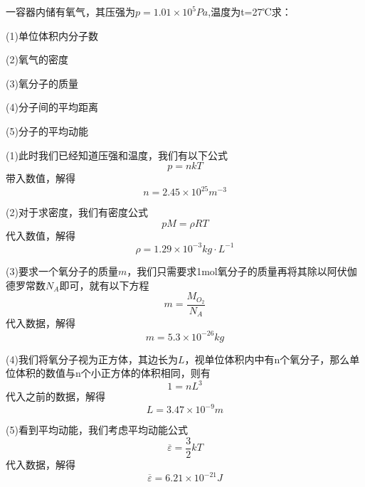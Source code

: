 \documentclass[lang=cn,10pt]{elegantbook}
\begin{document}
	\begin{example}
		一容器内储有氧气，其压强为$p=1.01\times 10^{5}Pa$,温度为t=27℃求：
		
		(1)单位体积内分子数
		
		(2)氧气的密度
		
		(3)氧分子的质量
		
		(4)分子间的平均距离
		
		(5)分子的平均动能
	\end{example}
	\begin{solution}
		(1)此时我们已经知道压强和温度，我们有以下公式
		\begin{equation*}
			p=nkT
		\end{equation*}
		带入数值，解得
		\begin{equation*}
			n=2.45\times10^{25}m^{-3}
		\end{equation*}
		
		(2)对于求密度，我们有密度公式
		\begin{equation*}
			pM=\rho RT
		\end{equation*}
		代入数值，解得
		\begin{equation*}
			\rho=1.29\times 10^{-3}kg\cdot L^{-1}
		\end{equation*}
		
		(3)要求一个氧分子的质量$m$，我们只需要求1mol氧分子的质量再将其除以阿伏伽德罗常数$N_{A}$即可，就有以下方程
		\begin{equation*}
			m=\frac{M_{O_{2}}}{N_{A}}
		\end{equation*}
		代入数据，解得
		\begin{equation*}
			m=5.3\times 10^{-26}kg
		\end{equation*}
		
		(4)我们将氧分子视为正方体，其边长为$L$，视单位体积内中有n个氧分子，那么单位体积的数值与n个小正方体的体积相同，则有
		\begin{equation*}
			1=nL^{3}
		\end{equation*}
		代入之前的数据，解得
		\begin{equation*}
			L=3.47\times 10^{-9}m
		\end{equation*}
		
		(5)看到平均动能，我们考虑平均动能公式
		\begin{equation*}
			\overline{\varepsilon }=\frac{3}{2}kT
		\end{equation*}
		代入数据，解得
		\begin{equation*}
			\overline{\varepsilon }=6.21\times10^{-21}J
		\end{equation*}
	\end{solution}
	
\end{document}

